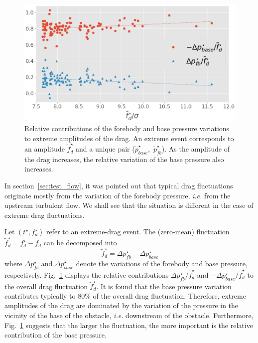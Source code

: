 \documentclass{jfm}
\newcommand{\EL}[1]{{\color{myred}{#1}}}
\begin{document}
\begin{figure}
  \centering
  \includegraphics[width=.8\linewidth]{pressure_ratio/pressure_ratio.png}
  \caption{\label{fig:pressure_ratio} Relative contributions of the forebody and base pressure variations to extreme amplitudes of the drag. An extreme event corresponds to an amplitude $\tilde f^{\star}_d$ and a unique pair  ($\tilde{p}^{\star}_{base}$,~$\tilde{p}^{\star}_{fb}$).
    As the amplitude of the drag increases, the relative variation of the base pressure also increases. \EL{The dotted lines represent a linear least-squares fitting of the relative pressure contributions as a function of the (normalized) drag.}
  }
\end{figure}

% 
In section~\ref{sec:test_flow}, it was pointed out that typical drag fluctuations originate mostly from the variation of the forebody pressure, \textit{i.e.} from the upstream turbulent flow.
We shall see that the situation is different in the case of {extreme} drag fluctuations.

% 
Let $(t^{\star}, f_d^{\star})$ refer to an extreme-drag event.
The (zero-mean) fluctuation $\tilde{f}_d^{\star} = f_d^{\star} - \overline{f_d}$ can be  decomposed into
\begin{equation}
  \tilde{f}_d^{\star} = \Delta p_{fb}^{\star} - \Delta p_{base}^{\star}
\end{equation}
where $\Delta p_{fb}^{\star}$ and $\Delta p_{base}^{\star}$ denote the variations of the forebody and base pressure, respectively.
% 
Fig.~\ref{fig:pressure_ratio} displays the relative contributions
$\Delta p_{fb}^{\star}/\tilde{f}_d^{\star}$ and $-\Delta p_{base}^{\star}/\tilde{f}_d^{\star}$ to the overall drag fluctuation $\tilde f_d^{\star}$.
% 
It is found that the base pressure variation contributes typically to $80\%$ of the overall drag fluctuation.
Therefore, extreme amplitudes of the drag are dominated by the variation of the pressure in the vicinity of the base of the obstacle, \emph{i.e.} downstream of the obstacle.
Furthermore, Fig.~\ref{fig:pressure_ratio} suggests that the larger the fluctuation, the more important is the relative contribution of the base pressure.
\end{document}
